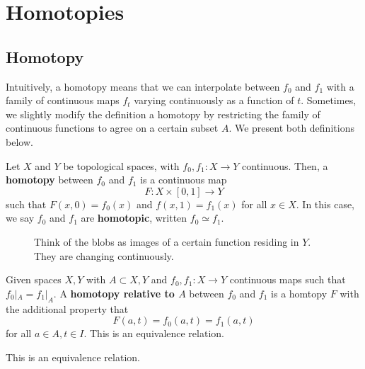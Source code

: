 \section{Homotopies}  

\subsection{Homotopy} 

  Intuitively, a homotopy means that we can interpolate between $f_0$ and $f_1$ with a family of continuous maps $f_t$ varying continuously as a function of $t$. Sometimes, we slightly modify the definition a homotopy by restricting the family of continuous functions to agree on a certain subset $A$. We present both definitions below. 

  \begin{definition}[Homotopy]
    Let $X$ and $Y$ be topological spaces, with $f_0, f_1: X \to Y$ continuous. Then, a \textbf{homotopy} between $f_0$ and $f_1$ is a continuous map 
    \begin{equation}
      F: X \times [0, 1] \to Y
    \end{equation}
    such that $F(x, 0) = f_0 (x)$ and $f(x, 1) = f_1 (x)$ for all $x \in X$. In this case, we say $f_0$ and $f_1$ are \textbf{homotopic}, written $f_0 \simeq f_1$. 

    \begin{figure}[H]
      \centering 
      \caption{Think of the blobs as images of a certain function residing in $Y$. They are changing continuously. }
      \label{fig:single_homotopy_class}
    \end{figure}

    Given spaces $X, Y$ with $A \subset X, Y$ and $f_0, f_1 : X \to Y$ continuous maps such that $f_0 |_A = f_1 |_A$. A \textbf{homotopy relative to $A$} between $f_0$ and $f_1$ is a homtopy $F$ with the additional property that 
    \begin{equation}
      F(a, t) = f_0 (a, t) = f_1 (a, t) 
    \end{equation} 
    for all $a \in A, t \in I$. This is an equivalence relation. 

    This is an equivalence relation. 
  \end{definition}

